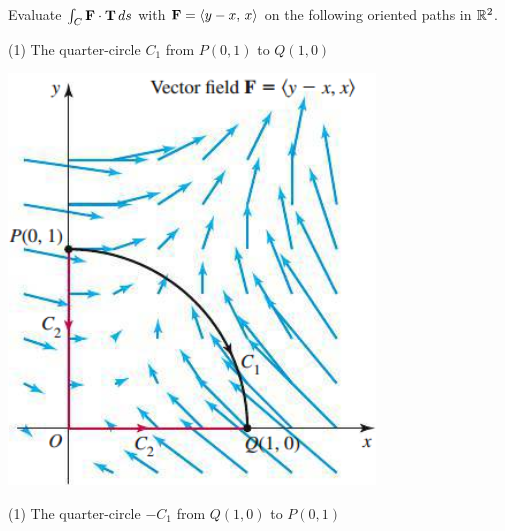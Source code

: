 \documentclass[mathNotesPreamble]{subfiles}
\begin{document}
  \begin{ex*}
    Evaluate $\int_C \mathbf F\cdot{\mathbf{T}}\,ds$ with $\mathbf F={\left\langle y-x,\,x \right\rangle}$ on the following oriented paths in $\mathbb{R}^2$.
  \end{ex*}
  \vspace*{-\baselineskip}
  \noindent
  \begin{minipage}[t]{0.6\linewidth}\mbox{}
    \begin{tasks}[after-item-skip=8\baselineskip, label=\alph*)](1)
      \task 
        The quarter-circle $C_1$ from $P(0,1)$ to $Q(1,0)$
    \end{tasks}
  \end{minipage}
  \begin{minipage}[t]{0.4\linewidth}\mbox{}
    \begin{flushright}
      \includegraphics[width=0.75\linewidth]{images/briggs_17_02/fig17_20}
    \end{flushright}
  \end{minipage}
  \begin{tasks}[after-item-skip=\stretch{1}, label=\alph*), resume](1)
      \task 
        The quarter-circle $-C_1$ from $Q(1,0)$ to $P(0,1)$
  \end{tasks}
  \pagebreak
\end{document}
